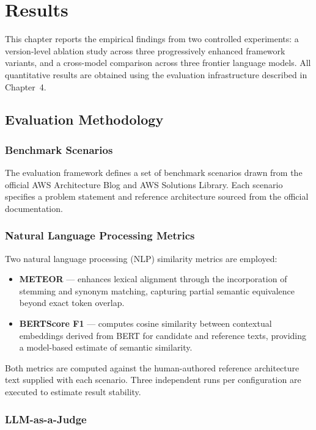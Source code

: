 \chapter{Results}

This chapter reports the empirical findings from two controlled experiments: a version-level ablation study across three progressively enhanced framework variants, and a cross-model comparison across three frontier language models. All quantitative results are obtained using the evaluation infrastructure described in Chapter~4.

\section{Evaluation Methodology}

\subsection{Benchmark Scenarios}

The evaluation framework defines a set of benchmark scenarios drawn from the official AWS Architecture Blog and AWS Solutions Library. Each scenario specifies a problem statement and reference architecture sourced from the official documentation.

\subsection{Natural Language Processing Metrics}

Two natural language processing (NLP) similarity metrics are employed:

\begin{itemize}
\item \textbf{METEOR} \cite{banerjee2005meteor} --- enhances lexical alignment through the incorporation of stemming and synonym matching, capturing partial semantic equivalence beyond exact token overlap.
\item \textbf{BERTScore F1} \cite{zhang2019bertscore} — computes cosine similarity between contextual embeddings derived from BERT for candidate and reference texts, providing a model-based estimate of semantic similarity.
\end{itemize}

Both metrics are computed against the human-authored reference architecture text supplied with each scenario. Three independent runs per configuration are executed to estimate result stability.
\subsection{LLM-as-a-Judge}

